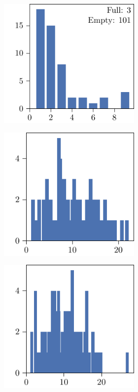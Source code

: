 \begin{figure}[p]
\begin{subfigure}{\textwidth}
\begin{subfigure}{\mymultiouter}
          \includegraphics[width=\mymultiinner]{figures/new/relaxed_common-rain_sydney-permutation-retraining}
    \end{subfigure}
  \end{subfigure}
  \centering
  \begin{subfigure}{\textwidth}
    \centering
    \begin{subfigure}{\mymultiouter}
        \centering
          \includegraphics[width=\mymultiinner]{figures/new/eucledian-rain_sydney-qlibra-permutation}
    \end{subfigure}
    \begin{subfigure}{\mymultiouter}
        \centering
          \includegraphics[width=\mymultiinner]{figures/new/eucledian-rain_sydney-qlibra-retraining}

\end{subfigure}
\end{subfigure}
\end{figure}
